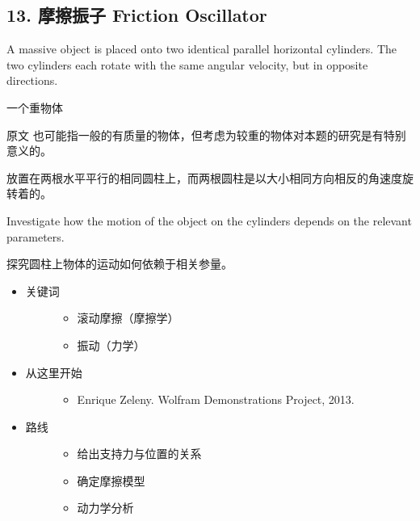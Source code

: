 \documentclass[a4paper,10pt,english]{sphinxmanual}
\begin{document}
\subsection{13. 摩擦振子 Friction Oscillator}
\label{\detokenize{8. Appendix:friction-oscillator}}
A massive object is placed onto two identical parallel horizontal cylinders. The two cylinders each rotate with the same angular velocity, but in opposite directions.

一个重物体 %
\begin{footnote}[8]\sphinxAtStartFootnote
原文  也可能指一般的有质量的物体，但考虑为较重的物体对本题的研究是有特别意义的。
%
\end{footnote} 放置在两根水平平行的相同圆柱上，而两根圆柱是以大小相同方向相反的角速度旋转着的。

Investigate how the motion of the object on the cylinders depends on the relevant parameters.

探究圆柱上物体的运动如何依赖于相关参量。

\noindent{}
\begin{itemize}
\item {} \begin{description}
\item[{关键词}] \leavevmode\begin{itemize}
\item {} 
滚动摩擦（摩擦学）

\item {} 
振动（力学）

\end{itemize}

\end{description}

\item {} \begin{description}
\item[{从这里开始}] \leavevmode\begin{itemize}
\item {} 
Enrique Zeleny.  Wolfram Demonstrations Project, 2013.

\end{itemize}

\end{description}

\item {} \begin{description}
\item[{路线}] \leavevmode\begin{itemize}
\item {} 
给出支持力与位置的关系

\item {} 
确定摩擦模型

\item {} 
动力学分析

\end{itemize}

\end{description}

\end{itemize}
\end{document}
